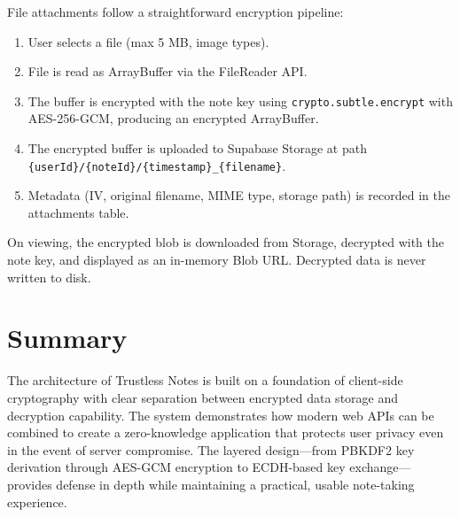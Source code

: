 File attachments follow a straightforward encryption pipeline:
\begin{enumerate}
    \item User selects a file (max 5 MB, image types).
    \item File is read as ArrayBuffer via the FileReader API.
    \item The buffer is encrypted with the note key using \texttt{crypto.subtle.encrypt} with AES-256-GCM, producing an encrypted ArrayBuffer.
    \item The encrypted buffer is uploaded to Supabase Storage at path \texttt{\{userId\}/\{noteId\}/\{timestamp\}\_\{filename\}}.
    \item Metadata (IV, original filename, MIME type, storage path) is recorded in the attachments table.
\end{enumerate}

On viewing, the encrypted blob is downloaded from Storage, decrypted with the note key, and displayed as an in-memory Blob URL. Decrypted data is never written to disk.

\section{Summary}

The architecture of Trustless Notes is built on a foundation of client-side cryptography with clear separation between encrypted data storage and decryption capability. The system demonstrates how modern web APIs can be combined to create a zero-knowledge application that protects user privacy even in the event of server compromise. The layered design---from PBKDF2 key derivation through AES-GCM encryption to ECDH-based key exchange---provides defense in depth while maintaining a practical, usable note-taking experience.
